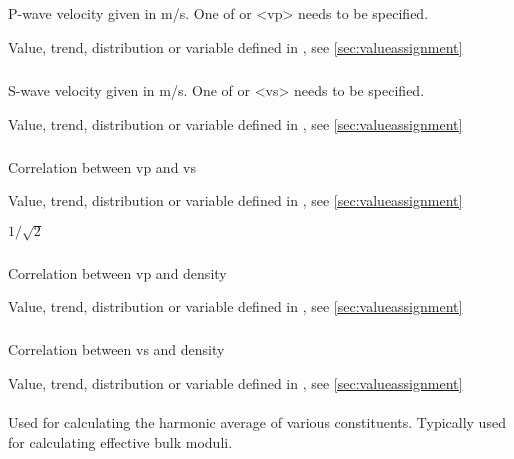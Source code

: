 {\subparagraph{}
 \slist
   \item \Description P-wave velocity given in m/s. One of  or <vp> needs to be specified.
   \item \Argument Value, trend, distribution or variable defined in , see \autoref{sec:valueassignment}
   \item \Default 
 \elist

\subparagraph{}
 \slist
   \item \Description S-wave velocity given in m/s. One of  or <vs> needs to be specified.
   \item \Argument Value, trend, distribution or variable defined in , see \autoref{sec:valueassignment}
   \item \Default 
 \elist

\subparagraph{}
 \slist
   \item \Description Correlation between vp and vs
   \item \Argument Value, trend, distribution or variable defined in , see \autoref{sec:valueassignment}
   \item \Default $1/\sqrt{2}$
 \elist

\subparagraph{}
 \slist
   \item \Description Correlation between vp and density
   \item \Argument Value, trend, distribution or variable defined in , see \autoref{sec:valueassignment}
   \item {}
 \elist

\subparagraph{}
 \slist
   \item \Description Correlation between vs and density
   \item \Argument Value, trend, distribution or variable defined in , see \autoref{sec:valueassignment}
   \item {}
 \elist

\paragraph{}
 \slist
   \item \Description Used for calculating the harmonic average of various constituents. Typically used for calculating effective bulk moduli. 
   \item \Argument
   \item \Default 
 \elist

}
